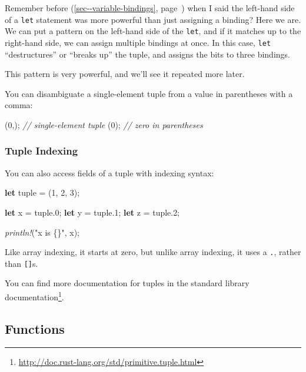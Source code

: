 \documentclass[a4paper,]{book}
\renewcommand*{\hyperref}[2][\ar]{%
  \def\ar{#2}%
  #2 (\autoref{#1}, page~\pageref{#1})}
\newenvironment{Shaded}{\begin{snugshade}}{\end{snugshade}}
\newcommand{\KeywordTok}[1]{\textcolor[rgb]{0.13,0.29,0.53}{\textbf{{#1}}}}
\newcommand{\DecValTok}[1]{\textcolor[rgb]{0.00,0.00,0.81}{{#1}}}
\newcommand{\StringTok}[1]{\textcolor[rgb]{0.31,0.60,0.02}{{#1}}}
\newcommand{\CommentTok}[1]{\textcolor[rgb]{0.56,0.35,0.01}{\textit{{#1}}}}
\newcommand{\PreprocessorTok}[1]{\textcolor[rgb]{0.56,0.35,0.01}{\textit{{#1}}}}
\newcommand{\NormalTok}[1]{{#1}}
\renewcommand{\href}[2]{#2\footnote{\url{#1}}}
\begin{document}
Remember \hyperref[sec--variable-bindings]{before} when I said the
left-hand side of a \texttt{let} statement was more powerful than just
assigning a binding? Here we are. We can put a pattern on the left-hand
side of the \texttt{let}, and if it matches up to the right-hand side,
we can assign multiple bindings at once. In this case, \texttt{let}
``destructures'' or ``breaks up'' the tuple, and assigns the bits to
three bindings.

This pattern is very powerful, and we'll see it repeated more later.

You can disambiguate a single-element tuple from a value in parentheses
with a comma:

\begin{Shaded}
\begin{Highlighting}[]
\NormalTok{(}\DecValTok{0}\NormalTok{,); }\CommentTok{// single-element tuple}
\NormalTok{(}\DecValTok{0}\NormalTok{); }\CommentTok{// zero in parentheses}
\end{Highlighting}
\end{Shaded}

\subsubsection{Tuple Indexing}\label{tuple-indexing}

You can also access fields of a tuple with indexing syntax:

\begin{Shaded}
\begin{Highlighting}[]
\KeywordTok{let} \NormalTok{tuple = (}\DecValTok{1}\NormalTok{, }\DecValTok{2}\NormalTok{, }\DecValTok{3}\NormalTok{);}

\KeywordTok{let} \NormalTok{x = tuple.}\DecValTok{0}\NormalTok{;}
\KeywordTok{let} \NormalTok{y = tuple.}\DecValTok{1}\NormalTok{;}
\KeywordTok{let} \NormalTok{z = tuple.}\DecValTok{2}\NormalTok{;}

\PreprocessorTok{println!}\NormalTok{(}\StringTok{"x is \{\}"}\NormalTok{, x);}
\end{Highlighting}
\end{Shaded}

Like array indexing, it starts at zero, but unlike array indexing, it
uses a \texttt{.}, rather than \texttt{{[}{]}}s.

You can find more documentation for tuples
\href{http://doc.rust-lang.org/std/primitive.tuple.html}{in the standard
library documentation}.

\subsection{Functions}\label{functions}
\end{document}
